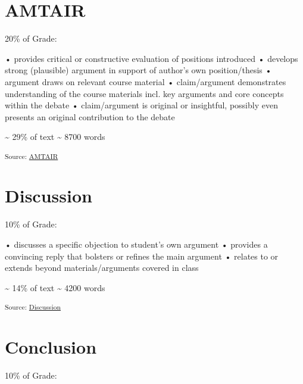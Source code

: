 \documentclass[12pt,a4paper]{book}      %
\begin{document}
\chapter{AMTAIR}\label{amtair}

20\% of Grade:

• provides critical or constructive evaluation of positions introduced •
develops strong (plausible) argument in support of author's own
position/thesis • argument draws on relevant course material •
claim/argument demonstrates understanding of the course materials incl.
key arguments and core concepts within the debate • claim/argument is
original or insightful, possibly even presents an original contribution
to the debate

\textasciitilde{} 29\% of text \textasciitilde{} 8700 words

\textsubscript{Source:
\href{https://VJMeyer.github.io/submission/chapters/AMTAIR.qmd.html\#66a99f1c-9dd6-40c4-97f6-f977c4a953f1}{AMTAIR}}

\chapter{}\label{section-4}

\chapter{Discussion}\label{discussion}

10\% of Grade:

• discusses a specific objection to student's own argument • provides a
convincing reply that bolsters or refines the main argument • relates to
or extends beyond materials/arguments covered in class

\textasciitilde{} 14\% of text \textasciitilde{} 4200 words

\textsubscript{Source:
\href{https://VJMeyer.github.io/submission/chapters/Discussion.qmd.html\#c5211e2d-0ed7-4ab0-838a-6545f2c41d91}{Discussion}}

\chapter{}\label{section-5}

\chapter{Conclusion}\label{conclusion}

10\% of Grade:
\end{document}
